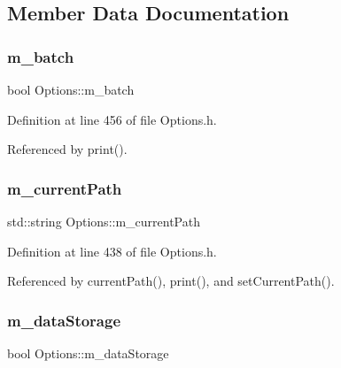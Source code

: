 \subsection{Member Data Documentation}
\mbox{\label{classOptions_ae4461f1dd3357c0478098fc32e809405}} 
\subsubsection{\texorpdfstring{m\+\_\+batch}{m\_batch}}
{\footnotesize\ttfamily bool Options\+::m\+\_\+batch\hspace{0.3cm}{\ttfamily [private]}}



Definition at line 456 of file Options.\+h.



Referenced by print().

\mbox{\label{classOptions_a9d82ad17fc1fd2315fc8a9e8d0d34f33}} 
\subsubsection{\texorpdfstring{m\+\_\+current\+Path}{m\_currentPath}}
{\footnotesize\ttfamily std\+::string Options\+::m\+\_\+current\+Path\hspace{0.3cm}{\ttfamily [private]}}



Definition at line 438 of file Options.\+h.



Referenced by current\+Path(), print(), and set\+Current\+Path().

\mbox{\label{classOptions_a244898bb30c9f716bdc335b4d85d1dfb}} 
\subsubsection{\texorpdfstring{m\+\_\+data\+Storage}{m\_dataStorage}}
{\footnotesize\ttfamily bool Options\+::m\+\_\+data\+Storage\hspace{0.3cm}{\ttfamily [private]}}



